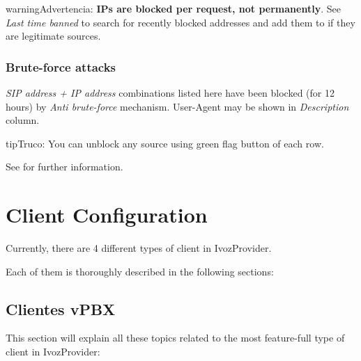 \documentclass[letterpaper,10pt,spanish]{sphinxmanual}
\begin{document}
\begin{notice}{warning}{Advertencia:}
\textbf{IPs are blocked per request, not permanently}. See \emph{Last time banned} to search for recently blocked
addresses and add them to {\hyperref[security_and_maintenance/security/authorized_ip_ranges:authorized\string-ip\string-ranges]{}} if they are legitimate sources.
\end{notice}


\subsection{Brute-force attacks}
\label{administration_portal/brand/views/bruteforce_attacks::doc}\label{administration_portal/brand/views/bruteforce_attacks:brute-force-attacks}\label{administration_portal/brand/views/bruteforce_attacks:id1}
\emph{SIP address + IP address} combinations listed here have been blocked (for 12 hours) by \emph{Anti brute-force} mechanism.
User-Agent may be shown in \emph{Description} column.

\begin{notice}{tip}{Truco:}
You can unblock any source using green flag button of each row.
\end{notice}

See {\hyperref[security_and_maintenance/security/antibruteforce:anti\string-brute\string-force\string-attacks]{}} for further information.


\chapter{Client Configuration}
\label{administration_portal/client/index:client-configuration}\label{administration_portal/client/index::doc}
Currently, there are 4 different types of client in IvozProvider.

Each of them is thoroughly described in the following sections:
\label{administration_portal/client/vpbx/index:vpbx-clients}

\section{Clientes vPBX}
\label{administration_portal/client/vpbx/index:vpbx-clients}\label{administration_portal/client/vpbx/index:clientes-vpbx}\label{administration_portal/client/vpbx/index::doc}\label{administration_portal/client/vpbx/index:id1}
This section will explain all these topics related to the most feature-full type of client in IvozProvider:
\end{document}
